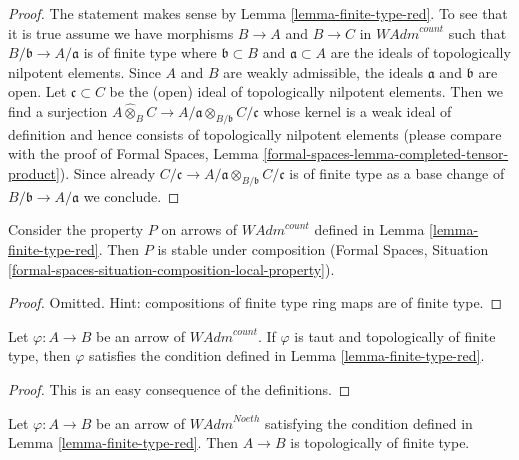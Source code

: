\begin{proof}
The statement makes sense by Lemma \ref{lemma-finite-type-red}.
To see that it is true assume we have morphisms $B \to A$ and $B \to C$
in $\textit{WAdm}^{count}$ such that $B/\mathfrak b \to A/\mathfrak a$
is of finite type where $\mathfrak b \subset B$ and $\mathfrak a \subset A$
are the ideals of topologically nilpotent elements.
Since $A$ and $B$ are weakly admissible, the ideals
$\mathfrak a$ and $\mathfrak b$ are open.
Let $\mathfrak c \subset C$ be the (open) ideal
of topologically nilpotent elements. Then we find a surjection
$A \widehat{\otimes}_B C \to
A/\mathfrak a \otimes_{B/\mathfrak b} C/\mathfrak c$
whose kernel is a weak ideal of definition and hence consists
of topologically nilpotent elements
(please compare with the proof of Formal Spaces,
Lemma \ref{formal-spaces-lemma-completed-tensor-product}). Since already
$C/\mathfrak c \to A/\mathfrak a \otimes_{B/\mathfrak b} C/\mathfrak c$
is of finite type as a base change of $B/\mathfrak b \to A/\mathfrak a$
we conclude.
\end{proof}

\begin{lemma}
\label{lemma-composition-finite-type-red}
Consider the property $P$ on arrows of $\textit{WAdm}^{count}$ defined in
Lemma \ref{lemma-finite-type-red}. Then $P$ is stable under composition
(Formal Spaces, Situation
\ref{formal-spaces-situation-composition-local-property}).
\end{lemma}

\begin{proof}
Omitted. Hint: compositions of finite type ring maps are of finite type.
\end{proof}

\begin{lemma}
\label{lemma-finite-type-finite-type-red}
Let $\varphi : A \to B$ be an arrow of $\textit{WAdm}^{count}$.
If $\varphi$ is taut and topologically of finite type, then $\varphi$
satisfies the condition defined in Lemma \ref{lemma-finite-type-red}.
\end{lemma}

\begin{proof}
This is an easy consequence of the definitions.
\end{proof}

\begin{lemma}
\label{lemma-Noetherian-finite-type-red}
Let $\varphi : A \to B$ be an arrow of $\textit{WAdm}^{Noeth}$
satisfying the condition defined in Lemma \ref{lemma-finite-type-red}.
Then $A \to B$ is topologically of finite type.
\end{lemma}

